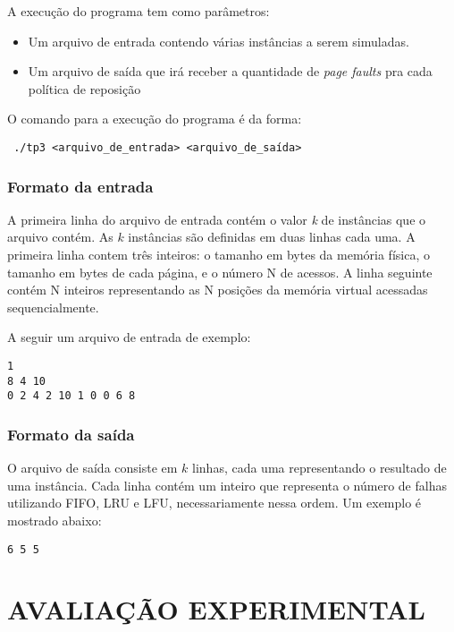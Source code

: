 \documentclass[12pt]{article}
\begin{document}
A execução do programa tem como parâmetros:
\begin{itemize}
\item Um arquivo de entrada contendo várias instâncias a serem simuladas.
\item Um arquivo de saída que irá receber a quantidade de \textit{page faults} pra cada política de reposição
\end{itemize}

O comando para a execução do programa é da forma:

\begin{footnotesize}
\begin{verbatim} ./tp3 <arquivo_de_entrada> <arquivo_de_saída>\end{verbatim}
\end{footnotesize}


\subsubsection{Formato da entrada}
\label{entrada}

A primeira linha do arquivo de entrada contém o valor \textit{k} de instâncias que o arquivo contém. As $k$ instâncias são definidas em duas linhas cada uma. A primeira linha contem três inteiros: o tamanho em bytes da memória física, o tamanho em bytes de cada página, e o número N de acessos. A linha seguinte contém N inteiros representando as N posições da memória virtual acessadas sequencialmente.

A seguir um arquivo de entrada de exemplo:

\begin{verbatim}
1
8 4 10
0 2 4 2 10 1 0 0 6 8
\end{verbatim}

\subsubsection{Formato da saída}
\label{saida}

O arquivo de saída consiste em $k$ linhas, cada uma representando o resultado de uma instância. Cada linha contém um inteiro que representa o número de falhas utilizando FIFO, LRU e LFU, necessariamente nessa ordem. Um exemplo é mostrado abaixo:

\begin{verbatim}
6 5 5
\end{verbatim}


\section{AVALIAÇÃO EXPERIMENTAL}
\label{avaliacao_experimental}
\end{document}
